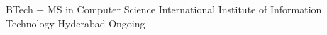 
\begin{cventries}
  \cventry
    {BTech + MS in Computer Science} %
    {International Institute of Information Technology} %
    {Hyderabad} %
    {Ongoing} %
    {
    }
\end{cventries}
